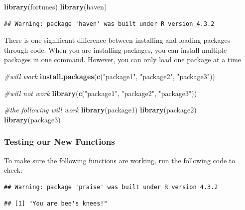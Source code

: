 \documentclass[
]{book}
\newenvironment{Shaded}{\begin{snugshade}}{\end{snugshade}}
\newcommand{\CommentTok}[1]{\textcolor[rgb]{0.56,0.35,0.01}{\textit{#1}}}
\newcommand{\FunctionTok}[1]{\textcolor[rgb]{0.13,0.29,0.53}{\textbf{#1}}}
\newcommand{\NormalTok}[1]{#1}
\newcommand{\StringTok}[1]{\textcolor[rgb]{0.31,0.60,0.02}{#1}}
\begin{document}
\begin{Shaded}
\begin{Highlighting}[]
\FunctionTok{library}\NormalTok{(fortunes)}
\FunctionTok{library}\NormalTok{(haven)}
\end{Highlighting}
\end{Shaded}

\begin{verbatim}
## Warning: package 'haven' was built under R version 4.3.2
\end{verbatim}

There is one significant difference between installing and loading packages through code. When you are installing packages, you can install multiple packages in one command. However, you can only load one package at a time

\begin{Shaded}
\begin{Highlighting}[]
\CommentTok{\#will work}
\FunctionTok{install.packages}\NormalTok{(}\FunctionTok{c}\NormalTok{(}\StringTok{"package1"}\NormalTok{, }\StringTok{"package2"}\NormalTok{, }\StringTok{"package3"}\NormalTok{)) }


\CommentTok{\#will not work}
\FunctionTok{library}\NormalTok{(}\FunctionTok{c}\NormalTok{(}\StringTok{"package1"}\NormalTok{, }\StringTok{"package2"}\NormalTok{, }\StringTok{"package3"}\NormalTok{)) }

\CommentTok{\#the following will work}
\FunctionTok{library}\NormalTok{(package1)}
\FunctionTok{library}\NormalTok{(package2)}
\FunctionTok{library}\NormalTok{(package3)}
\end{Highlighting}
\end{Shaded}

\hypertarget{testing-our-new-functions}{%
\subsubsection{Testing our New Functions}\label{testing-our-new-functions}}

To make sure the following functions are working, run the following code to check:

\begin{verbatim}
## Warning: package 'praise' was built under R version 4.3.2
\end{verbatim}

\begin{verbatim}
## [1] "You are bee's knees!"
\end{verbatim}
\end{document}
